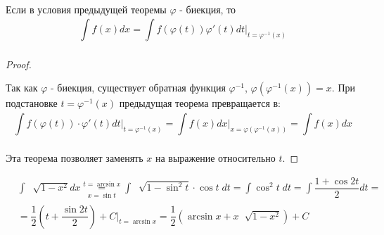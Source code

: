 \documentclass[../main.tex]{subfiles}
\begin{document}
\begin{crl}
    Если в условия предыдущей теоремы \( \varphi \) - биекция, то 
    \[ \displaystyle\int\limits_{ }^{ } f\left( x\right)dx= \displaystyle\int\limits_{ }^{ } f\left( \varphi \left( t\right)\right) \varphi '\left( t\right)dt\bigg|_{t= \varphi ^{-1}\left( x\right)}\]
\end{crl}
\begin{proof}
    
    ~

    Так как \( \varphi \) - биекция, существует обратная функция \( \varphi ^{-1}\), \( \varphi \left( \varphi ^{-1}\left( x\right)\right)=x\). При подстановке \( t = \varphi ^{-1}\left( x\right)\) предыдущая теорема превращается в:
    \[ \displaystyle\int\limits_{ }^{ } f\left( \varphi \left( t\right)\right) \cdot \varphi '\left( t\right)dt\bigg|_{t= \varphi ^{-1}\left( x\right)}= \displaystyle\int\limits_{ }^{ } f\left( x\right)dx\bigg|_{x= \varphi \left( \varphi ^{-1}\left( x\right)\right)}= \displaystyle\int\limits_{ }^{ } f\left( x\right)dx\]

    Эта теорема позволяет заменять \( x\) на выражение относительно \( t\).
\end{proof}

\begin{example}
    \begin{equation*}
        \begin{aligned}
            &\displaystyle\int\limits_{ }^{ } \;\sqrt[]{1-x^2}dx\underset{x=\sin t}{\overset{t=\arcsin x}{=}} \displaystyle\int\limits_{ }^{ } \;\sqrt[]{1-\sin^2t} \cdot \cos t\;dt= \displaystyle\int\limits_{ }^{ } \cos ^2t\;dt= \displaystyle\int\limits_{ }^{ } \dfrac{ 1+\cos2t}{ 2} dt=\\
            &= \dfrac{ 1}{ 2} \left( t+ \dfrac{ \sin2t}{ 2} \right)+C\bigg|_{t=\arcsin x}= \dfrac{ 1}{ 2} \left( \arcsin x+ x \;\sqrt[]{1-x^2}\right)+C
        \end{aligned}
    \end{equation*}
\end{example}
\end{document}
